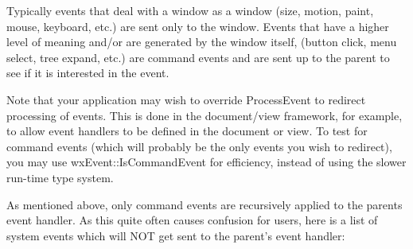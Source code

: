Typically events that deal with a window as a window (size, motion,
paint, mouse, keyboard, etc.) are sent only to the window.  Events
that have a higher level of meaning and/or are generated by the window
itself, (button click, menu select, tree expand, etc.) are command
events and are sent up to the parent to see if it is interested in the
event.

Note that your application may wish to override ProcessEvent to redirect processing of
events. This is done in the document/view framework, for example, to allow event handlers
to be defined in the document or view. To test for command events (which will probably
be the only events you wish to redirect), you may use wxEvent::IsCommandEvent for
efficiency, instead of using the slower run-time type system.

As mentioned above, only command events are recursively applied to the parents event
handler. As this quite often causes confusion for users, here is a list of system
events which will NOT get sent to the parent's event handler:

\begin{twocollist}\itemsep=0pt
\end{twocollist}

